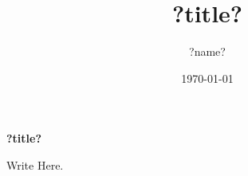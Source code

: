\documentclass[letterpaper]{turabian-researchpaper}
\title{?title?}
\subtitle{}
\author{?name?}
\date{\today}
\begin{document}
\maketitle
\doublespacing

\begin{center}
	\textbf{?title?}
\end{center}

Write Here.


\end{document}

